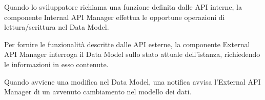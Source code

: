 
			Quando lo sviluppatore richiama una funzione definita dalle API interne, la componente Internal API Manager effettua le opportune operazioni di lettura/scrittura nel Data Model.

			Per fornire le funzionalità descritte dalle API esterne, la componente External API Manager interroga il Data Model sullo stato attuale dell'istanza, richiedendo le informazioni in esso contenute.

			Quando avviene una modifica nel Data Model, una notifica avvisa l'External API Manager di un avvenuto cambiamento nel modello dei dati.